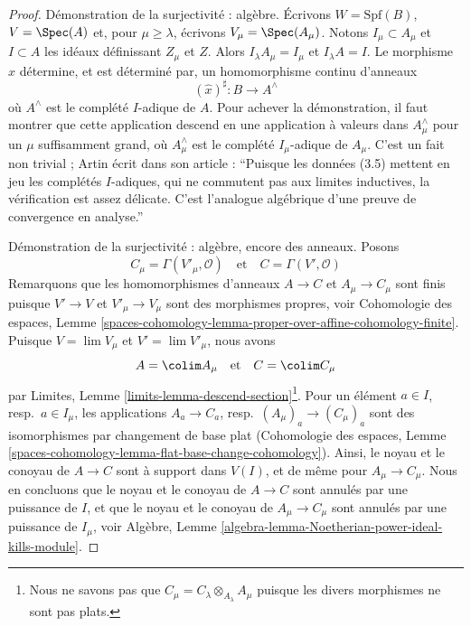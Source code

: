 \begin{proof}
\medskip\noindent
Démonstration de la surjectivité : algèbre.
Écrivons $W = \text{Spf}(B)$, $V = \Spec(A)$ et,
pour $\mu \geq \lambda$, écrivons $V_\mu = \Spec(A_\mu)$.
Notons $I_\mu \subset A_\mu$ et $I \subset A$
les idéaux définissant $Z_\mu$ et $Z$.
Alors $I_\lambda A_\mu = I_\mu$ et $I_\lambda A = I$.
Le morphisme $\hat x$ détermine, et est déterminé par, un
homomorphisme continu d'anneaux
$$
(\hat x)^\sharp : B \longrightarrow A^\wedge
$$
où $A^\wedge$ est le complété $I$-adique de $A$.
Pour achever la démonstration, il faut montrer que cette application descend en une application à valeurs dans
$A_\mu^\wedge$ pour un $\mu$ suffisamment grand, où $A_\mu^\wedge$
est le complété $I_\mu$-adique de $A_\mu$.
C'est un fait non trivial ; Artin écrit dans son article
\cite{ArtinII} : ``Puisque les données (3.5) mettent en jeu les complétés $I$-adiques,
qui ne commutent pas aux limites inductives, la vérification est assez
délicate. C'est l'analogue algébrique d'une preuve de convergence en analyse.''

\medskip\noindent
Démonstration de la surjectivité : algèbre, encore des anneaux.
Posons
$$
C_\mu = \Gamma(V'_\mu, \mathcal{O})
\quad\text{et}\quad
C = \Gamma(V', \mathcal{O})
$$
Remarquons que les homomorphismes d'anneaux $A \to C$ et $A_\mu \to C_\mu$ sont finis puisque
$V' \to V$ et $V'_\mu \to V_\mu$ sont des morphismes propres, voir
Cohomologie des espaces, Lemme
\ref{spaces-cohomology-lemma-proper-over-affine-cohomology-finite}.
Puisque $V = \lim V_\mu$ et $V' = \lim V'_\mu$,
nous avons
$$
A = \colim A_\mu
\quad\text{et}\quad
C = \colim C_\mu
$$
par Limites, Lemme \ref{limits-lemma-descend-section}\footnote{Nous ne
savons pas que $C_\mu = C_\lambda \otimes_{A_\lambda} A_\mu$ puisque les
divers morphismes ne sont pas plats.}. Pour un élément
$a \in I$, resp.\ $a \in I_\mu$, les applications $A_a \to C_a$,
resp.\ $(A_\mu)_a \to (C_\mu)_a$ sont des isomorphismes par changement de base plat
(Cohomologie des espaces, Lemme
\ref{spaces-cohomology-lemma-flat-base-change-cohomology}).
Ainsi, le noyau et le conoyau de $A \to C$ sont à support
dans $V(I)$, et de même pour $A_\mu \to C_\mu$.
Nous en concluons que le noyau et le conoyau de $A \to C$
sont annulés par une puissance de $I$, et que le noyau et le conoyau de
$A_\mu \to C_\mu$ sont annulés par une puissance de $I_\mu$, voir
Algèbre, Lemme \ref{algebra-lemma-Noetherian-power-ideal-kills-module}.


\end{proof}
